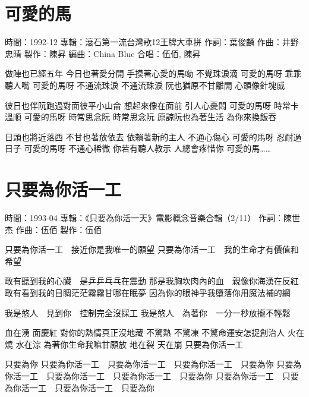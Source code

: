 \documentclass[UTF8,a4paper,oneside,twocolumn,12pt]{ctexbook}
\newcommand{\infopair}[2]{\textbullet #1：#2}
\newcommand{\zc}[1][伍佰]{\infopair{作詞}{#1}}
\newcommand{\zq}[1][伍佰]{\infopair{作曲}{#1}}
\newcommand{\bq}[1][伍佰]{\infopair{編曲}{#1}}
\newcommand{\zj}[1]{\infopair{專輯}{#1}}
\newcommand{\zz}[1]{\infopair{製作}{#1}}
\newcommand{\sj}[1]{\infopair{時間}{#1}}
\newenvironment{info}{\begin{flushleft}\kaishu
	}
	{\end{flushleft}\normalsize\yahei\par}
\newenvironment{lyric}{
	}
{}
\begin{document}
\section{可愛的馬}
\begin{info}
	\sj{1992-12}
	\zj{滾石第一流台灣歌12王牌大車拼}
	\zc[葉俊麟]
	\zq[井野忠晴]
	\zz{陳昇}
	\bq[China Blue]
	\infopair{合唱}{伍佰, 陳昇}
\end{info}
\begin{lyric}
	做陣也已經五年 今日也著愛分開
	手摸著心愛的馬呦 不覺珠淚滴
	可愛的馬呀 乖乖聽人嘴
	可愛的馬呀 不通流珠淚 不通流珠淚
	阮也猶原不甘離開 心頭像針塊威

	彼日也伴阮跑過對面彼平小山侖
	想起來像在面前 引人心憂悶
	可愛的馬呀 時常卡溫順 可愛的馬呀
	時常思念阮 時常思念阮
	原諒阮也為著生活 為你來換飯吞

	日頭也將近落西 不甘也著放依去
	依賴著新的主人 不通心傷心
	可愛的馬呀 忍耐過日子
	可愛的馬呀 不通心稀微
	你若有聽人教示 人總會疼惜你 可愛的馬……
\end{lyric}

\section{只要為你活一工}
\begin{info}
	\sj{1993-04}
	\zj{《只要為你活一天》電影概念音樂合輯（2/11）}
	\zc[陳世杰]
	\zq
	\zz{伍佰}
\end{info}
\begin{lyric}
	只要為你活一工　接近你是我唯一的願望
	只要為你活一工　我的生命才有價值和希望

	敢有聽到我的心臟　是乒乒乓乓在震動
	那是我胸坎肉內的血　親像你海湧在反紅
	敢有看到我的目睭茫茫霧霧甘哪在眠夢
	因為你的眼神乎我墮落你用魔法補的網

	我是憨人　見到你　控制完全沒採工
	我是憨人　為著你　一分一秒放攏不輕鬆

	血在湧 面慶紅 對你的熱情真正沒地藏
	不驚熱 不驚凍 不驚命運安怎捉創治人
	火在燒 水在淙 為著你生命我嘛甘願放
	地在裂 天在崩 只要為你活一工

	只要為你
	只要為你活一工　只要為你活一工　只要為你活一工　只要為你
	只要為你活一工　只要為你活一工　只要為你活一工　只要為你
	只要為你活一工　只要為你活一工　只要為你活一工　只要為你
\end{lyric}
\end{document}
